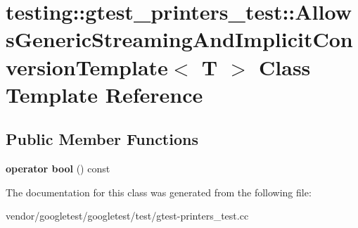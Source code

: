 \hypertarget{classtesting_1_1gtest__printers__test_1_1_allows_generic_streaming_and_implicit_conversion_template}{}\section{testing\+:\+:gtest\+\_\+printers\+\_\+test\+:\+:Allows\+Generic\+Streaming\+And\+Implicit\+Conversion\+Template$<$ T $>$ Class Template Reference}
\label{classtesting_1_1gtest__printers__test_1_1_allows_generic_streaming_and_implicit_conversion_template}
\subsection*{Public Member Functions}
\begin{DoxyCompactItemize}
\item 
\mbox{\label{classtesting_1_1gtest__printers__test_1_1_allows_generic_streaming_and_implicit_conversion_template_af5f8ea44d7d86283b4c004a994ddd7f9}} 
{\bfseries operator bool} () const
\end{DoxyCompactItemize}


The documentation for this class was generated from the following file\+:\begin{DoxyCompactItemize}
\item 
vendor/googletest/googletest/test/gtest-\/printers\+\_\+test.\+cc\end{DoxyCompactItemize}
